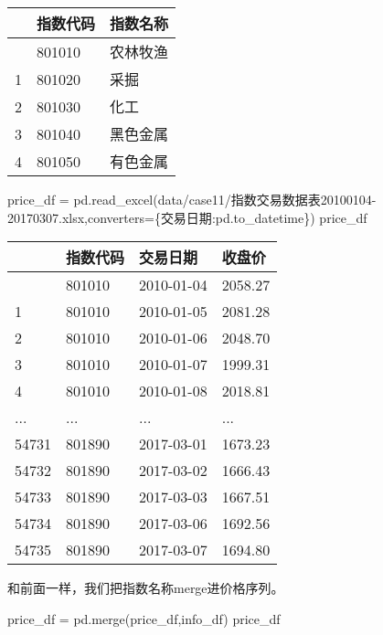 \documentclass[
  letterpaper,
  DIV=11,
  numbers=noendperiod]{scrreprt}
\newenvironment{Shaded}{\begin{snugshade}}{\end{snugshade}}
\newcommand{\NormalTok}[1]{\textcolor[rgb]{0.00,0.23,0.31}{#1}}
\newcommand{\OperatorTok}[1]{\textcolor[rgb]{0.37,0.37,0.37}{#1}}
\newcommand{\StringTok}[1]{\textcolor[rgb]{0.13,0.47,0.30}{#1}}
\begin{document}
\begin{longtable}[]{@{}lll@{}}
\toprule\noalign{}
& 指数代码 & 指数名称 \\
\midrule\noalign{}
\endhead
\bottomrule\noalign{}
\endlastfoot
0 & 801010 & 农林牧渔 \\
1 & 801020 & 采掘 \\
2 & 801030 & 化工 \\
3 & 801040 & 黑色金属 \\
4 & 801050 & 有色金属 \\
\end{longtable}

\begin{Shaded}
\begin{Highlighting}[]
\NormalTok{price\_df }\OperatorTok{=}\NormalTok{ pd.read\_excel(}\StringTok{\textquotesingle{}data/case11/指数交易数据表20100104{-}20170307.xlsx\textquotesingle{}}\NormalTok{,converters}\OperatorTok{=}\NormalTok{\{}\StringTok{\textquotesingle{}交易日期\textquotesingle{}}\NormalTok{:pd.to\_datetime\})}
\NormalTok{price\_df}
\end{Highlighting}
\end{Shaded}

\begin{longtable}[]{@{}llll@{}}
\toprule\noalign{}
& 指数代码 & 交易日期 & 收盘价 \\
\midrule\noalign{}
\endhead
\bottomrule\noalign{}
\endlastfoot
0 & 801010 & 2010-01-04 & 2058.27 \\
1 & 801010 & 2010-01-05 & 2081.28 \\
2 & 801010 & 2010-01-06 & 2048.70 \\
3 & 801010 & 2010-01-07 & 1999.31 \\
4 & 801010 & 2010-01-08 & 2018.81 \\
... & ... & ... & ... \\
54731 & 801890 & 2017-03-01 & 1673.23 \\
54732 & 801890 & 2017-03-02 & 1666.43 \\
54733 & 801890 & 2017-03-03 & 1667.51 \\
54734 & 801890 & 2017-03-06 & 1692.56 \\
54735 & 801890 & 2017-03-07 & 1694.80 \\
\end{longtable}

和前面一样，我们把指数名称merge进价格序列。

\begin{Shaded}
\begin{Highlighting}[]
\NormalTok{price\_df }\OperatorTok{=}\NormalTok{ pd.merge(price\_df,info\_df)}
\NormalTok{price\_df}
\end{Highlighting}
\end{Shaded}
\end{document}
